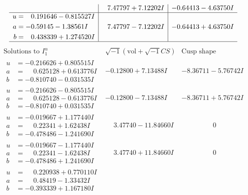 \documentclass[1p]{elsarticle_modified}
\theoremstyle{definition}
\newcommand{\I}{\sqrt{-1}}
\begin{document}
$$\begin{array}{c|c|c}
 & \phantom{-}7.47797 + 7.12202 I & -0.64413 - 4.63750 I \\ \hline\begin{aligned}
u &= \phantom{-}0.191646 - 0.815527 I \\
a &= -0.59145 - 1.38561 I \\
b &= \phantom{-}0.438339 + 1.274520 I\end{aligned}
 & \phantom{-}7.47797 - 7.12202 I & -0.64413 + 4.63750 I\\
 \hline 
 \end{array}$$\newpage$$\begin{array}{c|c|c}  
\text{Solutions to }I^u_{1}& \I (\text{vol} + \sqrt{-1}CS) & \text{Cusp shape}\\
 \hline 
\begin{aligned}
u &= -0.216626 + 0.805515 I \\
a &= \phantom{-}0.625128 + 0.613776 I \\
b &= -0.810740 - 0.031535 I\end{aligned}
 & -0.12800 + 7.13488 I & -8.36711 - 5.76742 I \\ \hline\begin{aligned}
u &= -0.216626 - 0.805515 I \\
a &= \phantom{-}0.625128 - 0.613776 I \\
b &= -0.810740 + 0.031535 I\end{aligned}
 & -0.12800 - 7.13488 I & -8.36711 + 5.76742 I \\ \hline\begin{aligned}
u &= -0.019667 + 1.177440 I \\
a &= \phantom{-}0.22341 + 1.62438 I \\
b &= -0.478486 - 1.241690 I\end{aligned}
 & \phantom{-}3.47740 - 11.84660 I & \phantom{-0.000000 } 0 \\ \hline\begin{aligned}
u &= -0.019667 - 1.177440 I \\
a &= \phantom{-}0.22341 - 1.62438 I \\
b &= -0.478486 + 1.241690 I\end{aligned}
 & \phantom{-}3.47740 + 11.84660 I & \phantom{-0.000000 } 0 \\ \hline\begin{aligned}
u &= \phantom{-}0.220938 + 0.770110 I \\
a &= \phantom{-}0.48419 - 1.33432 I \\
b &= -0.393339 + 1.167180 I\end{aligned}

\end{array}$$
\end{document}
